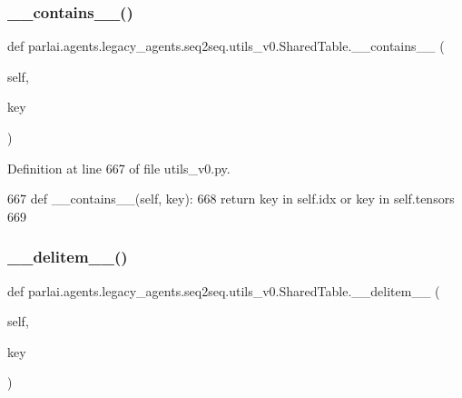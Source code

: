 \subsubsection{\texorpdfstring{\+\_\+\+\_\+contains\+\_\+\+\_\+()}{\_\_contains\_\_()}}
{\footnotesize\ttfamily def parlai.\+agents.\+legacy\+\_\+agents.\+seq2seq.\+utils\+\_\+v0.\+Shared\+Table.\+\_\+\+\_\+contains\+\_\+\+\_\+ (\begin{DoxyParamCaption}\item[{}]{self,  }\item[{}]{key }\end{DoxyParamCaption})}



Definition at line 667 of file utils\+\_\+v0.\+py.


\begin{DoxyCode}
667     \textcolor{keyword}{def }\_\_contains\_\_(self, key):
668         \textcolor{keywordflow}{return} key \textcolor{keywordflow}{in} self.idx \textcolor{keywordflow}{or} key \textcolor{keywordflow}{in} self.tensors
669 
\end{DoxyCode}
\mbox{\label{classparlai_1_1agents_1_1legacy__agents_1_1seq2seq_1_1utils__v0_1_1SharedTable_a9dec1e7ee1c932cec08159e26cd6b570}} 
\subsubsection{\texorpdfstring{\+\_\+\+\_\+delitem\+\_\+\+\_\+()}{\_\_delitem\_\_()}}
{\footnotesize\ttfamily def parlai.\+agents.\+legacy\+\_\+agents.\+seq2seq.\+utils\+\_\+v0.\+Shared\+Table.\+\_\+\+\_\+delitem\+\_\+\+\_\+ (\begin{DoxyParamCaption}\item[{}]{self,  }\item[{}]{key }\end{DoxyParamCaption})}



